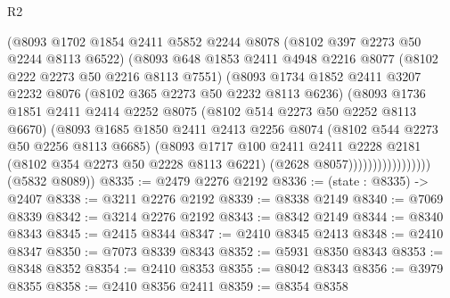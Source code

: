 \begin{lexlean}{R2}
\begin{coremodule}
                          (@8093
                            @1702
                            @1854
                            @2411
                            @5852
                            @2244
                            @8078
                            (@8102 @397 @2273 @50 @2244 @8113 @6522)
                            (@8093
                              @648
                              @1853
                              @2411
                              @4948
                              @2216
                              @8077
                              (@8102 @222 @2273 @50 @2216 @8113 @7551)
                              (@8093
                                @1734
                                @1852
                                @2411
                                @3207
                                @2232
                                @8076
                                (@8102 @365 @2273 @50 @2232 @8113 @6236)
                                (@8093
                                  @1736
                                  @1851
                                  @2411
                                  @2414
                                  @2252
                                  @8075
                                  (@8102 @514 @2273 @50 @2252 @8113 @6670)
                                  (@8093
                                    @1685
                                    @1850
                                    @2411
                                    @2413
                                    @2256
                                    @8074
                                    (@8102 @544 @2273 @50 @2256 @8113 @6685)
                                    (@8093
                                      @1717
                                      @100
                                      @2411
                                      @2411
                                      @2228
                                      @2181
                                      (@8102 @354 @2273 @50 @2228 @8113 @6221)
                                      (@2628 @8057)))))))))))))))))
      (@5832 @8089))
@8335 := @2479 @2276 @2192
@8336 := (state : @8335) -> @2407
@8338 := @3211 @2276 @2192
@8339 := @8338 @2149
@8340 := @7069 @8339
@8342 := @3214 @2276 @2192
@8343 := @8342 @2149
@8344 := @8340 @8343
@8345 := @2415 @8344
@8347 := @2410 @8345 @2413
@8348 := @2410 @8347
@8350 := @7073 @8339 @8343
@8352 := @5931 @8350 @8343
@8353 := @8348 @8352
@8354 := @2410 @8353
@8355 := @8042 @8343
@8356 := @3979 @8355
@8358 := @2410 @8356 @2411
@8359 := @8354 @8358

\end{coremodule}
\end{lexlean}
